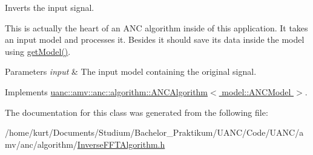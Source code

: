 Inverts the input signal. 

This is actually the heart of an A\+NC algorithm inside of this application. It takes an input model and processes it. Besides it should save its data inside the model using \hyperlink{classuanc_1_1amv_1_1anc_1_1algorithm_1_1_a_n_c_algorithm_a12ce80f6746cbb440cf771fc6878f7cf}{get\+Model()}.


\begin{DoxyParams}{Parameters}
{\em input} & The input model containing the original signal. \\
\hline
\end{DoxyParams}


Implements \hyperlink{classuanc_1_1amv_1_1anc_1_1algorithm_1_1_a_n_c_algorithm_abfdc7f14f7e41e408ee08037a839760d}{uanc\+::amv\+::anc\+::algorithm\+::\+A\+N\+C\+Algorithm$<$ model\+::\+A\+N\+C\+Model $>$}.



The documentation for this class was generated from the following file\+:\begin{DoxyCompactItemize}
\item 
/home/kurt/\+Documents/\+Studium/\+Bachelor\+\_\+\+Praktikum/\+U\+A\+N\+C/\+Code/\+U\+A\+N\+C/amv/anc/algorithm/\hyperlink{_inverse_f_f_t_algorithm_8h}{Inverse\+F\+F\+T\+Algorithm.\+h}\end{DoxyCompactItemize}

